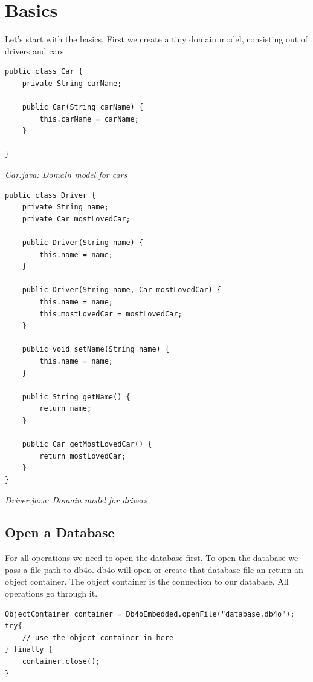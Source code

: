 
\chapter{Basics}
\label{tut:basics}

Let's start with the basics. First we create a tiny domain model, consisting out of drivers and cars.

\begin{lstlisting}
public class Car {
    private String carName;

    public Car(String carName) {
        this.carName = carName;
    }

}
\end{lstlisting}

{\small\itshape Car.java: Domain model for cars\par}
\medskip

\begin{lstlisting}
public class Driver {
    private String name;
    private Car mostLovedCar;

    public Driver(String name) {
        this.name = name;
    }

    public Driver(String name, Car mostLovedCar) {
        this.name = name;
        this.mostLovedCar = mostLovedCar;
    }

    public void setName(String name) {
        this.name = name;
    }

    public String getName() {
        return name;
    }

    public Car getMostLovedCar() {
        return mostLovedCar;
    }
}
\end{lstlisting}

{\small\itshape Driver.java: Domain model for drivers\par}
\medskip

\section{Open a Database}
\label{tut:basics:opendb}

For all operations we need to open the database first. To open the database we pass a file-path to db4o. db4o will open or create that database-file an return an object container. The object container is the connection to our database. All operations go through it.

\begin{lstlisting}
ObjectContainer container = Db4oEmbedded.openFile("database.db4o");
try{
    // use the object container in here
} finally {
    container.close();
}
\end{lstlisting}

